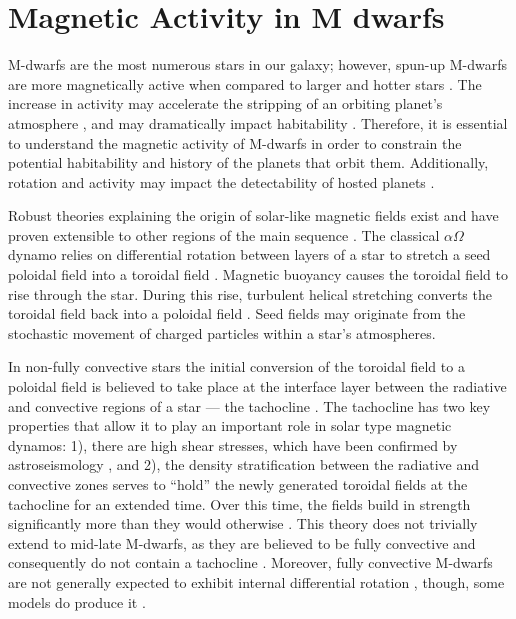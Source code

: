 \section{Magnetic Activity in M dwarfs} \label{sec:magActivity-intro}
M-dwarfs are the most numerous stars in our galaxy; however, spun-up M-dwarfs
are more magnetically active when compared to larger and hotter stars
\citep{Haw91, Del98, Sch14}. The increase in activity may accelerate the
stripping of an orbiting planet's atmosphere \citep[e.g.][]{Owe16}, and may
dramatically impact habitability \citep{Shi16}. Therefore, it is essential to
understand the magnetic activity of M-dwarfs in order to constrain the
potential habitability and history of the planets that orbit them.
Additionally, rotation and activity may impact the detectability of hosted
planets \citep[e.g.][]{Rob14, Newton2016, Van16}.

Robust theories explaining the origin of solar-like magnetic fields exist and
have proven extensible to other regions of the main sequence \citep{Cha14}. The
classical $\alpha\Omega$ dynamo relies on differential rotation between layers
of a star to stretch a seed poloidal field into a toroidal field \citep{Par55,
Cam17}. Magnetic buoyancy causes the toroidal field to rise through the star.
During this rise, turbulent helical stretching converts the toroidal field back
into a poloidal field \citep{Par55}. Seed fields may originate from the
stochastic movement of charged particles within a star's atmospheres.

In non-fully convective stars the initial conversion of the toroidal field to a
poloidal field is believed to take place at the interface layer between the
radiative and convective regions of a star --- the tachocline \citep{Noy84,
Tom96, Dik99}. The tachocline has two key properties that allow it to play an
important role in solar type magnetic dynamos: 1), there are high shear
stresses, which have been confirmed by astroseismology \citep{Tho96}, and 2),
the density stratification between the radiative and convective zones serves to
``hold'' the newly generated toroidal fields at the tachocline for an extended
time. Over this time, the fields build in strength significantly more than they
would otherwise \citep{Par75}. This theory does not trivially extend to
mid-late M-dwarfs, as they are believed to be fully convective and consequently
do not contain a tachocline \citep{Cha97}. Moreover, fully convective M-dwarfs
are not generally expected to exhibit internal differential rotation
\citep[e.g.][]{barnes2004differential, barnes2005dependence}, though, some
models do produce it \citep{Yad13}.

